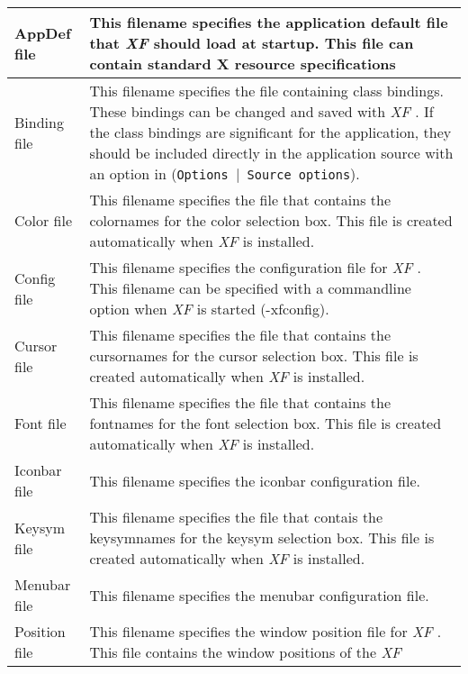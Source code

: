 {\begin{supertabular}{|l|p{7.8cm}|}
AppDef file       & This filename specifies the application
                    default file that {\em XF }
 should load at
                    startup. This file can contain standard
                    X resource specifications\\  \hline
Binding file      & This filename specifies the file
                    containing class bindings. These
                    bindings can be changed and saved with
                    {\em XF}
. If the class bindings are
                    significant for the application, they
                    should be included directly in the
                    application source with an option in
                    ({\tt Options $|$ Source options\tt}).\\  \hline
Color file        & This filename specifies the file
                    that contains the color\-names for the
                    color selection box. This file is
                    created automatically when {\em XF }
 is
                    installed.\\  \hline
Config file       & This filename specifies the
                    configuration file for {\em XF}
. This
                    filename can be specified with a
                    commandline option when {\em XF }
 is
                    started (-xfconfig).\\  \hline
Cursor file       & This filename specifies the file
                    that contains the cursor\-names for the
                    cursor selection box. This file is
                    created automatically when {\em XF }
 is
                    installed.\\  \hline
Font file         & This filename specifies the file
                    that contains the font\-names for the
                    font selection box. This file is
                    created automatically when {\em XF }
 is
                    installed.\\  \hline
Iconbar file      & This filename specifies the
                    iconbar configuration file.\\  \hline
Keysym file       & This filename specifies the file
                    that contais the keysym\-names for the
                    keysym selection box. This file is
                    created automatically when {\em XF }
 is
                    installed.\\  \hline
Menubar file      & This filename specifies the
                    menubar configuration file.\\  \hline
Position file     & This filename specifies the
                    window position file for {\em XF}
. This file
                    contains the window positions of the {\em XF }


\end{supertabular}}

